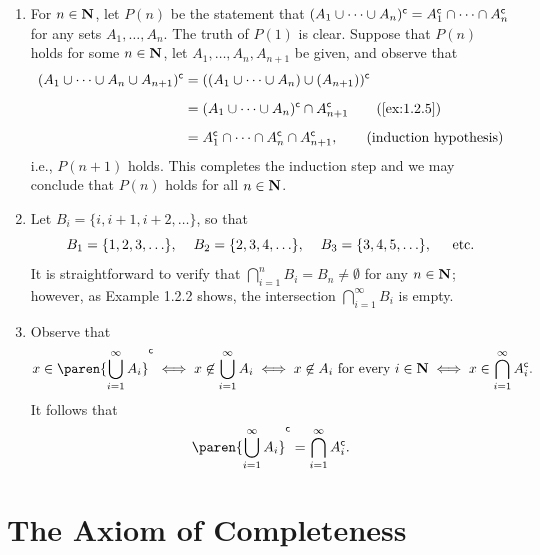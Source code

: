 \documentclass{lew98_solutions}
\begin{document}
\begin{solution}
    \begin{enumerate}
        \item For \( n \in \mathbf{N} \), let \( P(n) \) be the statement that \( (A_1 \cup \cdots \cup A_n)^{\mathsf{c}} = A_1^{\mathsf{c}} \cap \cdots \cap A_n^{\mathsf{c}} \) for any sets \( A_1, \ldots, A_n \). The truth of \( P(1) \) is clear. Suppose that \( P(n) \) holds for some \( n \in \mathbf{N} \), let \( A_1, \ldots, A_n, A_{n+1} \) be given, and observe that
        \begin{align*}
            \setcomp{(A_1 \cup \cdots \cup A_n \cup A_{n+1})} &= \setcomp{((A_1 \cup \cdots \cup A_n) \cup (A_{n+1}))} \\[2mm]
            &= \setcomp{(A_1 \cup \cdots \cup A_n)} \cap \setcomp{A_{n+1}} \tag{\Cref{ex:1.2.5}} \\[2mm]
            &= \setcomp{A_1} \cap \cdots \cap \setcomp{A_n} \cap \setcomp{A_{n+1}}, \tag{induction hypothesis}
        \end{align*}
        i.e., \( P(n + 1) \) holds. This completes the induction step and we may conclude that \( P(n) \) holds for all \( n \in \mathbf{N} \).

        \item Let \( B_i = \{ i, i + 1, i + 2, \ldots \} \), so that
        \[
            B_1 = \{ 1, 2, 3, \ldots \}, \hspace{4mm} B_2 = \{ 2, 3, 4, \ldots \}, \hspace{4mm} B_3 = \{ 3, 4, 5, \ldots \}, \hspace{4mm} \text{ etc}.
        \]
        It is straightforward to verify that \( \bigcap_{i=1}^n B_i = B_n \neq \emptyset \) for any \( n \in \mathbf{N} \); however, as Example 1.2.2 shows, the intersection \( \bigcap_{i=1}^{\infty} B_i \) is empty.

        \item Observe that
        \[
            x \in \setcomp{\paren{ \bigcup_{i=1}^{\infty} A_i }} \iff x \not\in \bigcup_{i=1}^{\infty} A_i \iff x \not\in A_i \text{ for every } i \in \N \iff x \in \bigcap_{i=1}^{\infty} \setcomp{A_i}.
        \]
        It follows that
        \[
            \setcomp{\paren{ \bigcup_{i=1}^{\infty} A_i }} = \bigcap_{i=1}^{\infty} \setcomp{A_i}.
        \]
    \end{enumerate}
\end{solution}

\section{The Axiom of Completeness}
\label{sec:1.3}
\end{document}
